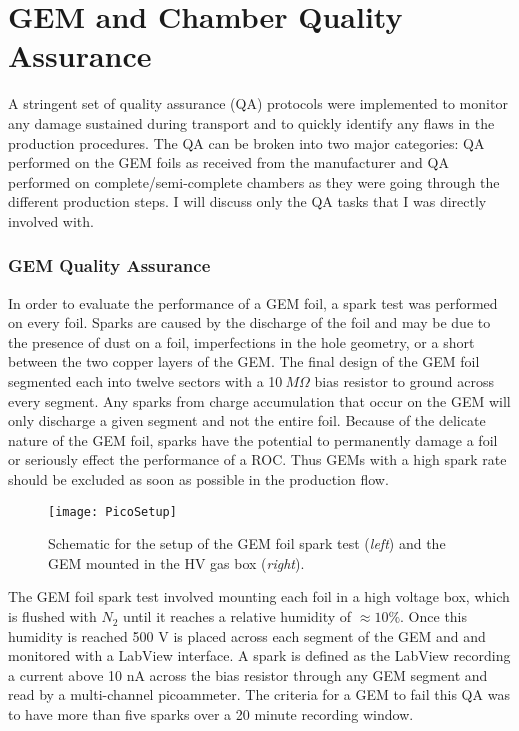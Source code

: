 \section{GEM and Chamber Quality Assurance}

A stringent set of quality assurance (QA)\cite{Brucken:2018rej}\cite{Brucken:2017qjy} protocols were implemented to monitor any damage sustained during transport and to quickly identify any flaws in the production procedures.  The QA can be broken into two major categories: QA performed on the GEM foils as received from the manufacturer and QA performed on complete/semi-complete chambers as they were going through the different production steps.  I will discuss only the QA tasks that I was directly involved with.

\subsubsection{GEM Quality Assurance}

In order to evaluate the performance of a GEM foil, a spark test was performed on every foil.  Sparks are caused by the discharge of the foil and may be due to the presence of dust on a foil, imperfections in the hole geometry, or a short between the two copper layers of the GEM.  The final design of the GEM foil segmented each into twelve sectors with a 10$\: M \Omega$ bias resistor to ground across every segment.  Any sparks from charge accumulation that occur on the GEM will only discharge a given segment and not the entire foil.  Because of the delicate nature of the GEM foil, sparks have the potential to permanently damage a foil or seriously effect the performance of a ROC.  Thus GEMs with a high spark rate should be excluded as soon as possible in the production flow.

\begin{figure}[h]
\texttt{[image: PicoSetup]}
\centering
\caption{Schematic for the setup of the GEM foil spark test (\textit{left})\cite{Brucken:2018rej} and the GEM mounted in the HV gas box (\textit{right}). }
\label{fig:PicoSetup}
\end{figure}

\noindent
The GEM foil spark test involved mounting each foil in a high voltage box, which is flushed with $N_{2}$ until it reaches a relative humidity of $\approx 10\%$.  Once this humidity is reached 500 V is placed across each segment of the GEM and and monitored with a LabView interface.  A spark is defined as the LabView recording a current above 10 nA across the bias resistor through any GEM segment and read by a multi-channel picoammeter.  The criteria for a GEM to fail this QA was to have more than five sparks over a 20 minute recording window.


